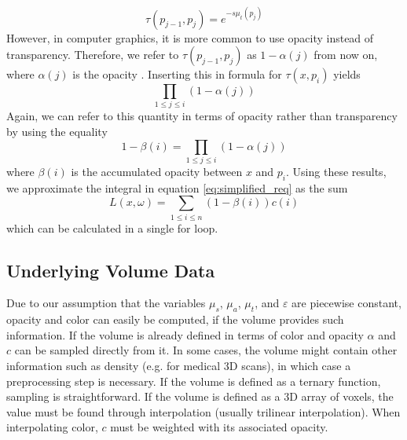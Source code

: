 \begin{equation}
\tau(p_{j-1}, p_j) = e^{-s\mu_t(p_j)}
\end{equation}
However, in computer graphics, it is more common to use opacity instead of transparency. Therefore, we refer to $\tau(p_{j-1}, p_j)$ as $1 - \alpha(j)$ from now on, where $\alpha(j)$ is the opacity \cite{10.1145/147130.147155}. Inserting this in formula for $\tau({x}, p_i)$ yields 
\begin{equation} \label{eq:discrete_transmittance}
\prod_{1 \le j \le i} (1 - \alpha(j))
\end{equation}
Again, we can refer to this quantity in terms of opacity rather than transparency by using the equality
\begin{equation}
1 - \beta(i) = \prod_{1 \le j \le i} (1 - \alpha(j))
\end{equation}
where $\beta(i)$ is the accumulated opacity \cite{10.1145/147130.147155} between ${x}$ and $p_i$.
Using these results, we approximate the integral in equation \ref{eq:simplified_req} as the sum
\begin{equation} \label{eq:discrete_approximation}
L({x},\omega) = \sum_{1 \le i \le n}(1 - \beta(i))c(i)
\end{equation}
which can be calculated in a single for loop\cite{10.1145/147130.147155}.


\subsection{Underlying Volume Data}
Due to our assumption that the variables $\mu_s$, $\mu_a$, $\mu_t$, and $\varepsilon$ are piecewise constant, opacity and color can easily be computed, if the volume provides such information. If the volume is already defined in terms of color and opacity $\alpha$ and $c$ can be sampled directly from it.
In some cases, the volume might contain other information such as density (e.g. for medical 3D scans), in which case a preprocessing step\cite{511} is necessary.
If the volume is defined as a ternary function, sampling is straightforward. If the volume is defined as a 3D array of voxels, the value must be found through interpolation (usually trilinear interpolation\cite{511}).
When interpolating color, $c$ must be weighted with its associated opacity\cite{729595}.


